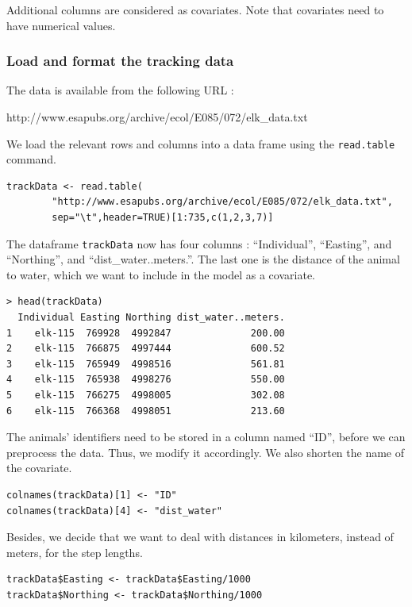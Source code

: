 \documentclass[]{article}
\begin{document}
Additional columns are considered as covariates. Note that covariates need to have numerical values.\\

\subsubsection{Load and format the tracking data}

The data is available from the following URL : 
\begin{center}
	http://www.esapubs.org/archive/ecol/E085/072/elk\_data.txt
\end{center}
We load the relevant rows and columns into a data frame using the \texttt{read.table} command.

\begin{lstlisting}
trackData <- read.table(
		"http://www.esapubs.org/archive/ecol/E085/072/elk_data.txt",
		sep="\t",header=TRUE)[1:735,c(1,2,3,7)]
\end{lstlisting}

The dataframe \texttt{trackData} now has four columns : ``Individual'', ``Easting'', and ``Northing'', and ``dist\_water..meters.''. The last one is the distance of the animal to water, which we want to include in the model as a covariate.

\begin{lstlisting}
> head(trackData)
  Individual Easting Northing dist_water..meters.
1    elk-115  769928  4992847              200.00
2    elk-115  766875  4997444              600.52
3    elk-115  765949  4998516              561.81
4    elk-115  765938  4998276              550.00
5    elk-115  766275  4998005              302.08
6    elk-115  766368  4998051              213.60
\end{lstlisting}

The animals' identifiers need to be stored in a column named ``ID'', before we can preprocess the data. Thus, we modify it accordingly. We also shorten the name of the covariate.

\begin{lstlisting}
colnames(trackData)[1] <- "ID"
colnames(trackData)[4] <- "dist_water"
\end{lstlisting}

Besides, we decide that we want to deal with distances in kilometers, instead of meters, for the step lengths.
\begin{lstlisting}
trackData$Easting <- trackData$Easting/1000
trackData$Northing <- trackData$Northing/1000
\end{lstlisting}
\end{document}
